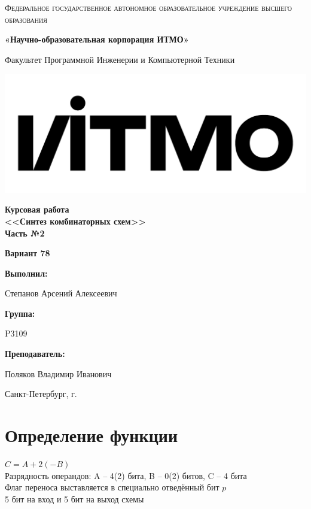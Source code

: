 \documentclass[12pt,a4paper]{report}
\begin{document}
\begin{titlepage}
	\centering
	{
        \scshape
        Федеральное государственное автономное образовательное учреждение высшего образования
        \par
        \textbf{«Научно-образовательная корпорация ИТМО»}
        \par
        \vspace*{1cm}
        Факультет Программной Инженерии и Компьютерной Техники
        \par
    }
    \vspace*{0.6cm}
    \includegraphics[width=\textwidth]{logo.png}
    {
        \Large
        \textbf{Курсовая работа\\ <<Синтез комбинаторных схем>>\\ Часть №2}
        \par 
        \normalsize
        \vspace*{0.75cm}
        \textbf{Вариант 78}
        \par
    }
    \vfill
    \hfill\begin{minipage}{\dimexpr\textwidth-7.8cm}
        \textbf{Выполнил:}\par
        Степанов Арсений Алексеевич\par
        \vspace*{0.15cm}
        \textbf{Группа:}\par
        P3109\par
        \vspace*{0.15cm}
        \textbf{Преподаватель:}\par
        Поляков Владимир Иванович\par
    \end{minipage}
    \vfill
    Санкт-Петербург, \the\year{}г.
\end{titlepage}
\onehalfspacing
\section*{Определение функции}
$C=A+2(-B)$\\ 
Разрядность операндов: A -- 4(2) бита, B -- 0(2) битов, C -- 4 бита\\
Флаг переноса выставляется в специально отведённый бит $p$\\
5 бит на вход и 5 бит на выход схемы
\end{document}
